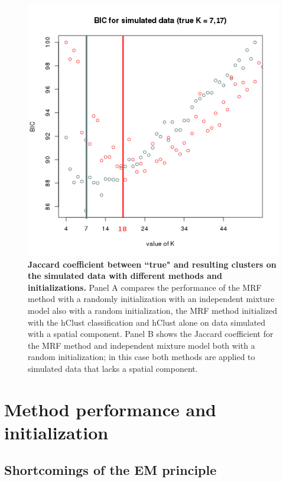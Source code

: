	\begin{figure}[h]
\centerline{\includegraphics[width=\linewidth]{gfx/chapter5/simulated_k.png}}
\caption{{\bf Jaccard coefficient between ``true" and resulting clusters on the simulated data with different methods and initializations.} Panel A compares the performance of the MRF method with a randomly initialization with an independent mixture model also with a random initialization, the MRF method initialized with the hClust classification and hClust alone on data simulated with a spatial component. Panel B shows the Jaccard coefficient for the MRF method and independent mixture model both with a random initialization; in this case both methods are applied to simulated data that lacks a spatial component.}

\label{fig:simulatedK}
	\end{figure}

\section{Method performance and initialization}
	\subsection{Shortcomings of the EM principle}
